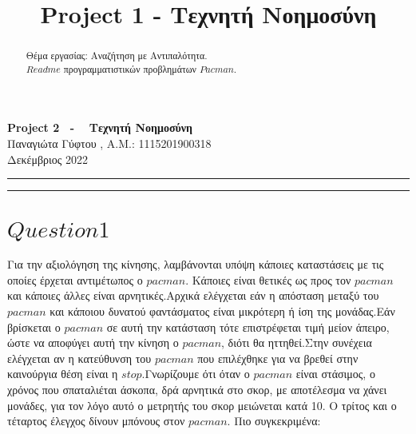 \documentclass[10pt]{article}
\title{ \selectlanguage{english} Project 1 - \selectlanguage{greek} Τεχνητή Νοημοσύνη}
\begin{document}
   
   \begin{center}
        {\Large \textbf{ Project 2 \ - \  Τεχνητή Νοημοσύνη}}\\
        \vspace{1em}
        {\large Παναγιώτα Γύφτου ,   A.M.: 1115201900318  } \\
        \vspace{1em}
        {\large Δεκέμβριος 2022}
    \end{center}
    
    
    \begin{center}
        \rule{150mm}{0.2mm}
    \end{center}

    \begin{abstract}
    Θέμα εργασίας: Αναζήτηση με Αντιπαλότητα. \\ 
    
    $Readme$ προγραμματιστικών προβλημάτων $Pacman$.
    

    \end{abstract}

    \begin{center}
        \rule{150mm}{0.2mm}
    \end{center}

    \vspace{5mm}

\section*{$Question 1$}
\hspace{10mm}
Για την αξιολόγηση της κίνησης, λαμβάνονται υπόψη κάποιες καταστάσεις με τις οποίες έρχεται αντιμέτωπος ο $pacman$. Κάποιες είναι θετικές ως προς τον $pacman$ και κάποιες άλλες είναι αρνητικές.Αρχικά ελέγχεται εάν η απόσταση μεταξύ του $pacman$ και κάποιου δυνατού φαντάσματος είναι μικρότερη ή ίση της μονάδας.Εάν βρίσκεται ο $pacman$ σε αυτή την κατάσταση τότε επιστρέφεται τιμή μείον άπειρο, ώστε να αποφύγει αυτή την κίνηση ο $pacman$, διότι θα ηττηθεί.Στην συνέχεια ελέγχεται αν η κατεύθυνση του $pacman$ που επιλέχθηκε για να βρεθεί στην καινούργια θέση είναι η $stop$.Γνωρίζουμε ότι όταν ο $pacman$ είναι στάσιμος, ο χρόνος που σπαταλιέται άσκοπα, δρά αρνητικά στο σκορ, με αποτέλεσμα να χάνει μονάδες, για τον λόγο αυτό ο μετρητής του σκορ μειώνεται κατά 10. Ο τρίτος και ο τέταρτος έλεγχος δίνουν μπόνους στον $pacman$. Πιο συγκεκριμένα: \\
\end{document}
